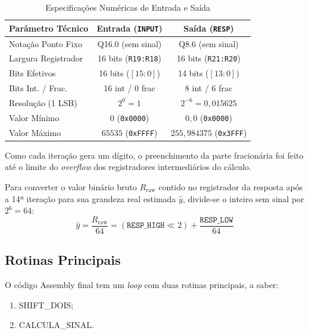 \documentclass[conference]{IEEEtran}
\begin{document}
\begin{table}[htbp]
	\caption{Especificações Numéricas de Entrada e Saída}
	\label{tab:limites}
	\centering
	\footnotesize
	\setlength{\tabcolsep}{3.5pt}
	\begin{tabularx}{\columnwidth}{@{}Xcc@{}}
		\toprule
		\textbf{Parâmetro Técnico} & \textbf{Entrada (\texttt{INPUT})} & \textbf{Saída (\texttt{RESP})}   \\
		\midrule
		Notação Ponto Fixo         & Q16.0 (sem sinal)                 & Q8.6 (sem sinal)                 \\
		Largura Registrador        & 16 bits (\texttt{R19:R18})        & 16 bits (\texttt{R21:R20})       \\
		Bits Efetivos              & 16 bits ($[15:0]$)                & 14 bits ($[13:0]$)               \\
		Bits Int. / Frac.          & 16 int / 0 frac                   & 8 int / 6 frac                   \\
		Resolução (1 LSB)          & $2^0 = 1$                         & $2^{-6} = 0{,}015625$            \\
		Valor Mínimo               & $0$ (\texttt{0x0000})             & $0{,}0$ (\texttt{0x0000})        \\
		Valor Máximo               & $65535$ (\texttt{0xFFFF})         & $255{,}984375$ (\texttt{0x3FFF}) \\
		\bottomrule
	\end{tabularx}
\end{table}

Como cada iteração gera um dígito, o preenchimento da parte fracionária foi feito até o limite do \textit{overflow} dos registradores intermediários do cálculo.

Para converter o valor binário bruto $R_{\text{raw}}$ contido no registrador da resposta após a 14ª iteração para sua grandeza real estimada $\hat{y}$, divide-se o inteiro sem sinal por $2^6 = 64$:
\begin{equation}
	\hat{y} = \frac{R_{\text{raw}}}{64} = (\texttt{RESP\_HIGH} \ll 2) + \frac{\texttt{RESP\_LOW}}{64}
	\label{eq:conversao}
\end{equation}

\subsection{Rotinas Principais}
O código Assembly final tem um \textit{loop} com duas rotinas principais, a saber:
\begin{enumerate}
    \item SHIFT\_DOIS;
    \item CALCULA\_SINAL.
\end{enumerate}
\end{document}

